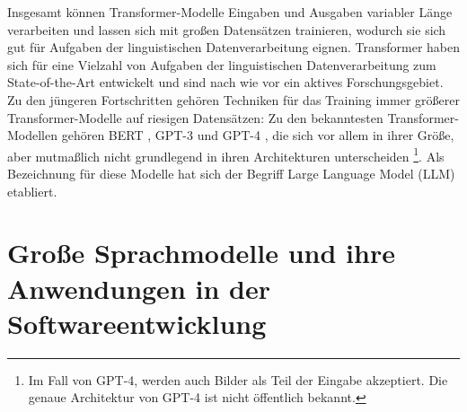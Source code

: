 Insgesamt können Transformer-Modelle Eingaben und Ausgaben variabler Länge verarbeiten und lassen sich mit großen Datensätzen trainieren, wodurch sie sich gut für Aufgaben der linguistischen Datenverarbeitung eignen.
Transformer haben sich für eine Vielzahl von Aufgaben der linguistischen Datenverarbeitung zum State-of-the-Art entwickelt und sind nach wie vor ein aktives Forschungsgebiet.
Zu den jüngeren Fortschritten gehören Techniken für das Training immer größerer Transformer-Modelle auf riesigen Datensätzen:
Zu den bekanntesten Transformer-Modellen gehören BERT \cite{bert}, GPT-3 \cite{FewShotLearners} und GPT-4 \cite{gpt4}, die sich vor allem in ihrer Größe, aber mutmaßlich nicht grundlegend in ihren Architekturen unterscheiden \footnote{Im Fall von GPT-4, werden auch Bilder als Teil der Eingabe akzeptiert. Die genaue Architektur von GPT-4 ist nicht öffentlich bekannt.}.
Als Bezeichnung für diese Modelle hat sich der Begriff \foreignlanguage{english}{Large Language Model} (LLM) etabliert.

\iffalse
\section{Große Sprachmodelle und ihre Anwendungen in der Softwareentwicklung}
\label{subsec:Foundations:LLM}



